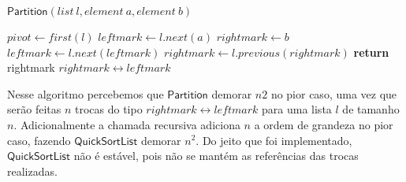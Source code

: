 \documentclass{homework}
\begin{document}
\begin{enumerate}
		$\mathsf{Partition}(list\ l, element\ a, element\ b)$
		\begin{algorithmic}[1]
			\State $pivot \gets first(l)$
			\State $leftmark \gets l.next(a)$
			\State $rightmark \gets b$
					\State $leftmark \gets l.next(leftmark)$
				\EndWhile
					\State $rightmark \gets l.previous(rightmark)$
				\EndWhile
					\State \textbf{return} rightmark
				\Else
					\State $rightmark \longleftrightarrow leftmark$
				\EndIf
			\EndWhile
		\end{algorithmic}

\pagebreak		
		
		Nesse algoritmo	percebemos que $\mathsf{Partition}$ demorar $n2$ no pior caso, uma vez que serão feitas $n$ trocas do tipo $rightmark \longleftrightarrow leftmark$ para uma lista $l$ de tamanho $n$. Adicionalmente a chamada recursiva adiciona $n$ a ordem de grandeza no pior caso, fazendo $\mathsf{QuickSortList}$ demorar $n^2$. Do jeito que foi implementado, $\mathsf{QuickSortList}$ não é estável, pois não se mantém as referências das trocas realizadas.
		
	\end{enumerate}
\end{document}
